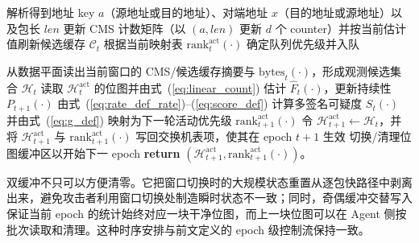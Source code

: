 \begin{algorithm}[htbp]
\caption{\textsc{MS-SatShield} 多签名在网检测与队列调度流程}
\label{alg:ms_satshield}

解析得到地址 key $a$（源地址或目的地址）、对端地址 $x$（目的地址或源地址）以及包长 $len$\;
更新 CMS 计数矩阵（以 $(a,len)$ 更新 $d$ 个 counter）并按当前估计值刷新候选缓存 $\mathcal{C}_t$\;
\BlankLine
{}
根据当前映射表 $\text{rank}_t^{\mathrm{act}}(\cdot)$ 确定队列优先级并入队\;

\BlankLine
{}
从数据平面读出当前窗口的 CMS/候选缓存摘要与 $\text{bytes}_t(\cdot)$，形成观测候选集合 $\mathcal{H}_{t}$\;
读取 $\mathcal{H}_t^{\mathrm{act}}$ 的位图并由式~(\ref{eq:linear_count}) 估计 $\widehat{F}_t(\cdot)$，更新持续性 $P_{t+1}(\cdot)$\;
由式~(\ref{eq:rate_def_rate})--(\ref{eq:score_def}) 计算多签名可疑度 $S_t(\cdot)$ 并由式~(\ref{eq:g_def}) 映射为下一轮活动优先级 $\text{rank}_{t+1}^{\mathrm{act}}(\cdot)$\;
令 $\mathcal{H}_{t+1}^{\mathrm{act}}\leftarrow\mathcal{H}_{t}$，并将 $\mathcal{H}_{t+1}^{\mathrm{act}}$ 与 $\text{rank}_{t+1}^{\mathrm{act}}(\cdot)$ 写回交换机表项，使其在 epoch $t+1$ 生效\;
切换/清理位图缓冲区以开始下一 epoch\;
\textbf{return} $(\mathcal{H}_{t+1}^{\mathrm{act}}, \text{rank}_{t+1}^{\mathrm{act}}(\cdot))$。
\end{algorithm}

双缓冲不只可以方便清零。它把窗口切换时的大规模状态重置从逐包快路径中剥离出来，避免攻击者利用窗口切换处制造瞬时状态不一致；同时，奇偶缓冲交替写入保证当前 epoch 的统计始终对应一块干净位图，而上一块位图可以在 Agent 侧按批次读取和清理。这种时序安排与前文定义的 epoch 级控制流保持一致。

